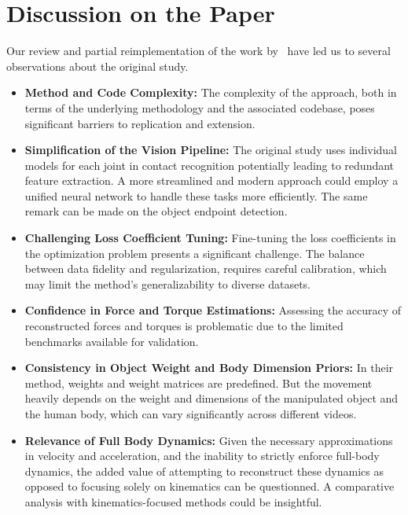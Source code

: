 \section{Discussion on the Paper}
\label{sec:discussion}

Our review and partial reimplementation of the work by~\citet{li2019estimating} have led us to several observations about 
the original study.

\begin{itemize}
    \item \textbf{Method and Code Complexity:} The complexity of the approach, both in terms of the underlying methodology and the associated 
    codebase, poses significant barriers to replication and extension.

    \item \textbf{Simplification of the Vision Pipeline:} The original study uses individual models for each joint in contact recognition
    potentially leading to redundant feature extraction. A more streamlined and modern approach could employ a unified neural network to handle 
    these tasks more efficiently. The same remark can be made on the object endpoint detection.

    \item \textbf{Challenging Loss Coefficient Tuning:} Fine-tuning the loss coefficients in the optimization problem presents a significant 
    challenge. The balance between data fidelity and regularization, requires careful calibration, which may 
    limit the method's generalizability to diverse datasets. 

    \item \textbf{Confidence in Force and Torque Estimations:} Assessing the accuracy of reconstructed forces and torques is problematic due 
    to the limited benchmarks available for validation.

    \item \textbf{Consistency in Object Weight and Body Dimension Priors:} In their method, weights and weight matrices are predefined. 
    But the movement heavily depends on the weight and dimensions of the manipulated object and the human body, which can vary significantly 
    across different videos. 

    \item \textbf{Relevance of Full Body Dynamics:} Given the necessary approximations in velocity and acceleration, and the inability to 
    strictly enforce full-body dynamics, the added value of attempting to reconstruct these dynamics as opposed to focusing 
    solely on kinematics can be questionned. A comparative analysis with kinematics-focused methods could be insightful.


\end{itemize}
